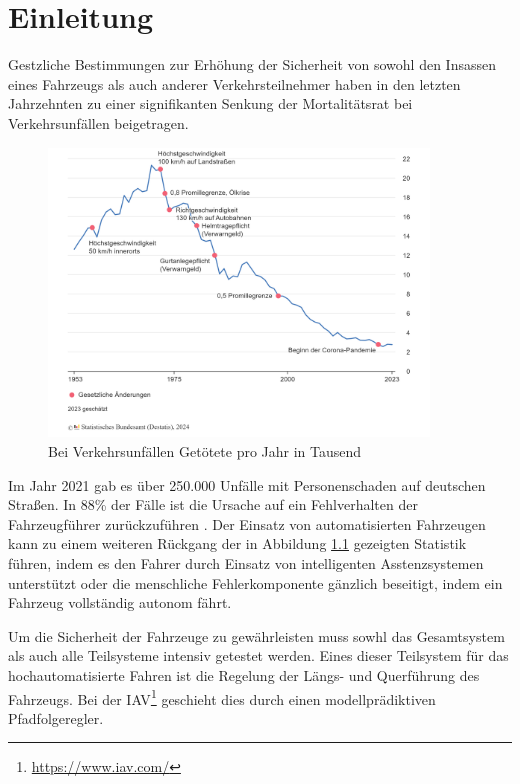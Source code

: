 \chapter{Einleitung} \label{chap:Einleitung}
\thispagestyle{empty}
Gestzliche Bestimmungen zur Erhöhung der Sicherheit von sowohl den Insassen eines Fahrzeugs als auch anderer Verkehrsteilnehmer haben in den letzten Jahrzehnten zu einer signifikanten Senkung der Mortalitätsrat bei Verkehrsunfällen beigetragen.
\begin{figure} [H]
    \centering
    \includegraphics[width=0.9\textwidth]{figures/1_Einleitung/verkehrsunfaelle-getoetete-jahr.png}
    \caption{Bei Verkehrsunfällen Getötete pro Jahr in Tausend \cite{StBA2021}}
    \label{fig:Statistik_Tote}
\end{figure}
\noindent Im Jahr 2021 gab es über 250.000 Unfälle mit Personenschaden auf deutschen Straßen. In 88\% der Fälle ist die Ursache auf ein Fehlverhalten der Fahrzeugführer zurückzuführen \cite{StBA2021}. Der Einsatz von automatisierten Fahrzeugen kann zu einem weiteren Rückgang der in Abbildung \ref{fig:Statistik_Tote} gezeigten Statistik führen, indem es den Fahrer durch Einsatz von intelligenten Asstenzsystemen unterstützt oder die menschliche Fehlerkomponente gänzlich beseitigt, indem ein Fahrzeug vollständig autonom fährt.

Um die Sicherheit der Fahrzeuge zu gewährleisten muss sowhl das Gesamtsystem als auch alle Teilsysteme intensiv getestet werden. Eines dieser Teilsystem für das hochautomatisierte Fahren ist die Regelung der Längs- und Querführung des Fahrzeugs. Bei der IAV\footnote{\url{https://www.iav.com/}} geschieht dies durch einen modellprädiktiven Pfadfolgeregler.\bigskip

